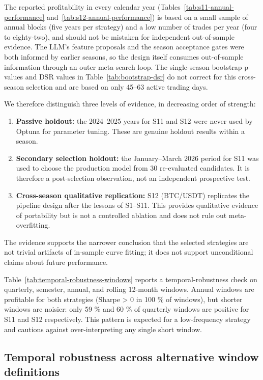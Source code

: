 \documentclass[11pt,a4paper]{article}
\begin{document}
The reported profitability in every calendar year (Tables~\ref{tab:s11-annual-performance} and~\ref{tab:s12-annual-performance}) is based on a small sample of annual blocks (five years per strategy) and a low number of trades per year (four to eighty-two), and should not be mistaken for independent out-of-sample evidence. The LLM's feature proposals and the season acceptance gates were both informed by earlier seasons, so the design itself consumes out-of-sample information through an outer meta-search loop. The single-season bootstrap p-values and DSR values in Table~\ref{tab:bootstrap-dsr} do not correct for this cross-season selection and are based on only 45--63 active trading days.

We therefore distinguish three levels of evidence, in decreasing order of strength:

\begin{enumerate}
\def\labelenumi{\arabic{enumi}.}
\item
  \textbf{Passive holdout:} the 2024--2025 years for S11 and S12 were never used by Optuna for parameter tuning. These are genuine holdout results within a season.
\item
  \textbf{Secondary selection holdout:} the January--March 2026 period for S11 was used to choose the production model from 30 re-evaluated candidates. It is therefore a post-selection observation, not an independent prospective test.
\item
  \textbf{Cross-season qualitative replication:} S12 (BTC/USDT) replicates the pipeline design after the lessons of S1--S11. This provides qualitative evidence of portability but is not a controlled ablation and does not rule out meta-overfitting.
\end{enumerate}

The evidence supports the narrower conclusion that the selected strategies are not trivial artifacts of in-sample curve fitting; it does not support unconditional claims about future performance.

Table~\ref{tab:temporal-robustness-windows} reports a temporal-robustness check on quarterly, semester, annual, and rolling 12-month windows. Annual windows are profitable for both strategies (Sharpe \textgreater{} 0 in 100 \% of windows), but shorter windows are noisier: only 59 \% and 60 \% of quarterly windows are positive for S11 and S12 respectively. This pattern is expected for a low-frequency strategy and cautions against over-interpreting any single short window.

\subsection{Temporal robustness across alternative window definitions}\label{table-10-temporal-robustness-across-alternative-window-definitions}
\end{document}
